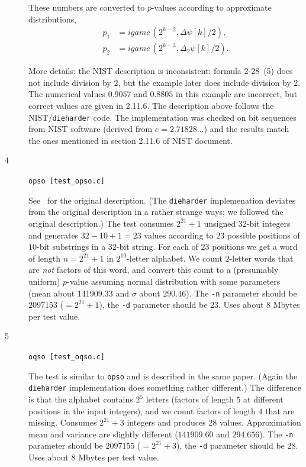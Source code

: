 \documentclass[12pt,a4paper,fullpage]{article}
\begin{document}
\begin{description}
These numbers are converted to $p$-values according to approximate distributions,
\begin{align*}
    p_1 &= \textit{igamc}\,(2^{k-2},\Delta\psi[k]/2),\\
    p_2 &= \textit{igamc}\,(2^{k-3},\Delta_2\psi[k]/2).
\end{align*}   

More details:  the NIST description is inconsistent: formula 2-28~(5) does not include division by $2$, but the example later does include division by $2$. The numerical values  $0.9057$ and $0.8805$ in this example are incorrect, but correct values are given in 2.11.6. The description above follows the NIST/\texttt{dieharder} code. The implementation was checked on bit sequences from NIST software (derived from $e=2.71828\ldots$) and the results match the ones mentioned in section 2.11.6 of NIST document.

\item[4] \texttt{opso [test\_opso.c]}

See~\cite{marsaglia-zaman} for the original description. (The \texttt{dieharder} implemenation deviates from the original description in a rather strange ways; we followed the original description.) The test consumes $2^{21}+1$ unsigned $32$-bit integers and generates $32-10+1=23$ values according to $23$ possible positions of $10$-bit substrings in a $32$-bit string. For each of $23$ positions we get a word of length $n=2^{21}+1$ in $2^{10}$-letter alphabet. We count $2$-letter words that are \emph{not} factors of this word, and convert this count to a  (presumably uniform) $p$-value assuming normal distribution with some parameters (mean about 141909.33 and $\sigma$ about $290.46$). The \texttt{-n} parameter should be $2097153$ (${}=2^{21}+1$), the \texttt{-d} parameter should be $23$. Uses about $8$ Mbytes per test value.

\item[5] \texttt{oqso [test\_oqso.c]}

The test is similar to \texttt{opso} and is described in the same paper. (Again the \texttt{dieharder} implementation does something rather different.) The difference is that the alphabet contains $2^5$ letters (factors of length $5$ at different positions in the input integers), and we count factors of length $4$ that are missing. Consumes $2^{21}+3$ integers and produces $28$ values. Approximation mean and variance are slightly different ($141909.60$ and $294.656$). The \texttt{-n} parameter should be $2097155$ (${}=2^{21}+3$), the \texttt{-d} parameter should be $28$. Uses about $8$ Mbytes per test value.


\end{description}
\end{document}

